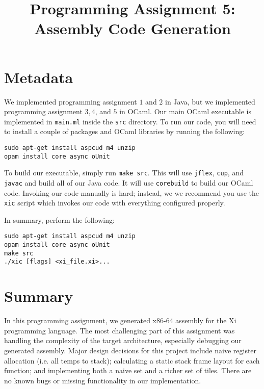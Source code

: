 \documentclass{hw}
\title{Programming Assignment 5:\\ Assembly Code Generation}
\begin{document}
\maketitle

\section{Metadata}\label{sec:metadata}
We implemented programming assignment $1$ and $2$ in Java, but we implemented
programming assignment $3,4$, and $5$ in OCaml. Our main OCaml executable is
implemented in \texttt{main.ml} inside the \texttt{src} directory. To run our
code, you will need to install a couple of packages and OCaml libraries by
running the following:

\begin{center}
\begin{BVerbatim}
sudo apt-get install aspcud m4 unzip
opam install core async oUnit
\end{BVerbatim}
\end{center}

To build our executable, simply run \texttt{make src}. This will use
\texttt{jflex}, \texttt{cup}, and \texttt{javac} and build all of our Java
code. It will use \texttt{corebuild} to build our OCaml code. Invoking our
code manually is hard; instead, we we recommend you use the \texttt{xic} script
which invokes our code with everything configured properly.

In summary, perform the following:

\begin{center}
\begin{BVerbatim}
sudo apt-get install aspcud m4 unzip
opam install core async oUnit
make src
./xic [flags] <xi_file.xi>...
\end{BVerbatim}
\end{center}

\section{Summary}\label{sec:summary}
In this programming assignment, we generated x86-64 assembly for the Xi programming language.
The most challenging part of this assignment was handling the complexity of the target
architecture, especially debugging our generated assembly. Major design decisions for this
project include naive register allocation (i.e. all temps to stack); calculating a static
stack frame layout for each function; and implementing both a naive set and a richer set of
tiles. There are no known bugs or missing functionality in our implementation.
\end{document}
